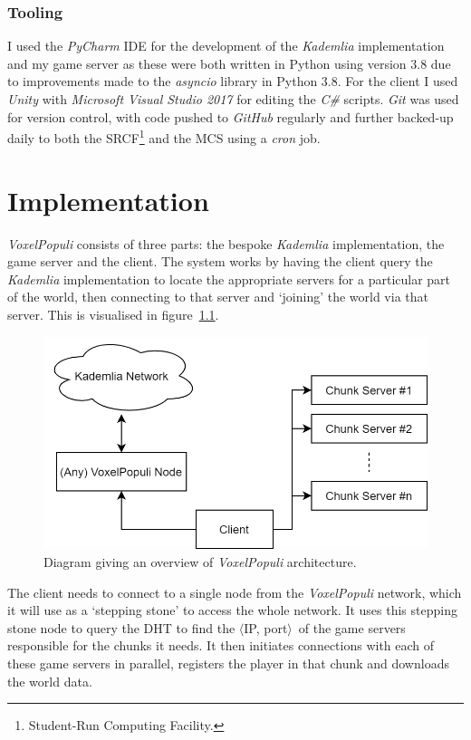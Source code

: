 \documentclass[12pt,notitlepage,a4paper]{report}
\newcommand{\unity}{\emph{Unity}}
\newcommand{\kademlia}{\emph{Kademlia}}
\newcommand{\voxpop}{\emph{VoxelPopuli}}
\begin{document}
	\subsection{Tooling}
	I used the \emph{PyCharm} IDE for the development of the \kademlia{} implementation and my game server as these were both written in Python using version $3.8$ due to improvements made to the \emph{asyncio} library in Python $3.8$. For the client I used \unity{} with \emph{Microsoft Visual Studio 2017} for editing the \emph{C\#} scripts. \emph{Git} was used for version control, with code pushed to \emph{GitHub} regularly and further backed-up daily to both the SRCF\footnote{Student-Run Computing Facility.} and the MCS using a \emph{cron} job.
	
	\clearpage
	\chapter{Implementation}
	\voxpop{} consists of three parts: the bespoke \kademlia{} implementation, the game server and the client. The system works by having the client query the \kademlia{} implementation to locate the appropriate servers for a particular part of the world, then connecting to that server and `joining' the world via that server. This is visualised in figure~\ref{fig:diagram1}.
	
	\begin{figure}[!ht]
		\includegraphics[width=\textwidth]{diag1.png}
		\caption{Diagram giving an overview of \voxpop{} architecture.}
		\label{fig:diagram1}
	\end{figure}
	The client needs to connect to a single node from the \voxpop{} network, which it will use as a `stepping stone' to access the whole network. It uses this stepping stone node to query the DHT to find the $\langle$IP, port$\rangle$~of the game servers responsible for the chunks it needs. It then initiates connections with each of these game servers in parallel, registers the player in that chunk and downloads the world data.
	
\end{document}

